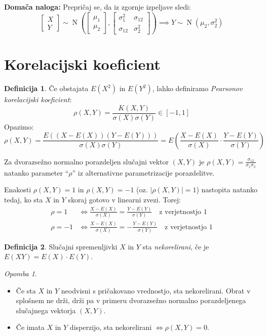 \documentclass[12pt]{book}
\def\n{\noindent}
\theoremstyle{definition}
\newtheorem{definicija}{Definicija}
\theoremstyle{plain}
\theoremstyle{plain}
\theoremstyle{plain}
\theoremstyle{remark}
\newtheorem*{opomba}{Opomba}
\begin{document}
\n \textbf{Domača naloga:} Prepričaj se, da iz zgornje izpeljave sledi:
$$
\begin{bmatrix}
    X \\
    Y
    \end{bmatrix} \sim \operatorname{N}\left(\begin{bmatrix}
    \mu_1 \\
    \mu_2
    \end{bmatrix},\begin{bmatrix}
    \sigma_1^2 & \sigma_{12} \\
    \sigma_{12} & \sigma_2^2
    \end{bmatrix}\right) \implies Y \sim \operatorname{N}\left(\mu_2, \sigma_2^2\right)
$$

\section{Korelacijski koeficient}

\begin{definicija}
    Če obstajata $E\left(X^2\right)$ in $E\left(Y^2\right)$, lahko definiramo \emph{Pearsonov korelacijski koeficient}: 
    $$
    \rho(X, Y)=\frac{K(X, Y)}{\sigma(X) \sigma(Y)} \in [-1, 1]
    $$
    Opazimo: 
    $$
    \rho(X, Y)=\frac{E((X-E(X)) (Y-E(Y)))}{\sigma(X) \sigma(Y)} = E\left(\frac{X-E(X)}{\sigma(X)} \cdot \frac{Y-E(Y)}{\sigma(Y)}\right)
    $$
\end{definicija}

\begin{zgled}
    Za dvorazsežno normalno porazdeljen slučajni vektor $(X,Y)$ je $\rho(X, Y)=\frac{\sigma_{12}}{\sigma_1 \sigma_2}$ natanko parameter “$\rho$” iz alternativne parametrizacije porazdelitve. 
\end{zgled}

\n Enakosti $\rho(X, Y)=1$ in $\rho(X, Y)=-1$ (oz. $|\rho(X, Y)|=1$) nastopita natanko tedaj, ko sta $X$ in $Y$ skoraj gotovo v linearni zvezi. Torej:
$$
\begin{aligned}
    \rho=1 &\iff \frac{X-E(X)}{\sigma(X)}=\frac{Y-E(Y)}{\sigma(Y)} \quad \text {z verjetnostjo 1} \\
    \rho=-1 &\iff \frac{X-E(X)}{\sigma(X)}=-\frac{Y-E(Y)}{\sigma(Y)} \quad \text {z verjetnostjo 1}
\end{aligned}
$$

\begin{definicija}
    Slučajni spremenljivki $X$ in $Y$ sta \emph{nekorelirani}, če je $E(XY) = E(X) \cdot E(Y)$. 
\end{definicija}

\begin{opomba}
    ~

    \begin{itemize}
        \item Če sta $X$ in $Y$ neodvisni s pričakovano vrednostjo, sta nekorelirani. Obrat v splošnem ne drži, drži pa v primeru dvorazsežno normalno porazdeljenega slučajnega vektorja $(X,Y)$.
        \item Če imata $X$ in $Y$ disperzijo, sta nekorelirani $\iff \rho(X,Y) = 0$.
    \end{itemize}
\end{opomba}
\end{document}
